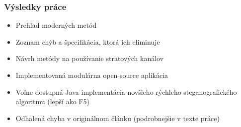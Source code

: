 \documentclass{beamer}
\begin{document}
\begin{frame}
    \frametitle{Výsledky práce}
    \begin{itemize}
        \item Prehľad moderných metód
        \item Zoznam chýb a špecifikácia, ktorá ich eliminuje
        \item Návrh metódy na používanie stratových kanálov
        \item Implementovaná modulárna open-source aplikácia
        \item Voľne dostupná Java implementácia novšieho rýchleho steganografického algoritmu (lepší ako F5)
        \item Odhalená chyba v originálnom článku (podrobnejšie v texte práce)
    \end{itemize}
    
\end{frame}
\end{document}
